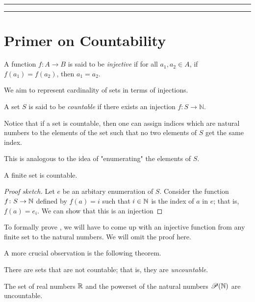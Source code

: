 \documentclass[11pt,usenames, dvipsnames]{article}
\begin{document}
\vspace{5truemm}
\hrule
\hrule

\section*{\large \centering Primer on Countability}
\noindent

\begin{definition}[Injection]
  A function $f \colon A \to B$ is said to be \emph{injective} if for all $a_1, a_2 \in A$, if $f(a_1) = f(a_2)$, then $a_1 = a_2$.
\end{definition}

We aim to represent cardinality of sets in terms of injections.

\begin{definition}
  A set $S$ is said to be \emph{countable} if there exists an injection $f \colon S \to \mathbb{N}$.
\end{definition}

Notice that if a set is countable, then one can assign indices which are natural numbers to the elements of the set such that no two elements of $S$ get the same index.

This is analogous to the idea of "enumerating" the elements of $S$.

\begin{claim}
  A finite set is countable.
\end{claim}

\begin{proof}[Proof sketch]
  Let $e$ be an arbitary enumeration of $S$. Consider the function $f \colon S \to \mathbb{N}$ defined by $f(a) = i$ such that $i \in \mathbb{N}$ is the index of $a$ in $e$; that is, $f(a) = e_i$. We can show that this is an injection
\end{proof}

To formally prove , we will have to come up with an injective function from any finite set to the natural numbers. We will omit the proof here.

A more crucial observation is the following theorem.

\begin{theorem}
  There are sets that are not countable; that is, they are \emph{uncountable}.
\end{theorem}

\begin{example}
  The set of real numbers $\mathbb{R}$ and the powerset of the natural numbers $\mathscr{P}(\mathbb{N})$ are uncountable.
\end{example}
\end{document}
